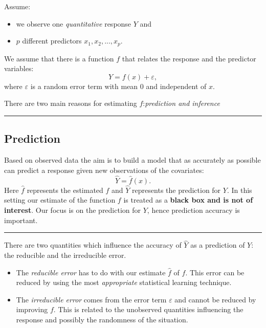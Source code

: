 \documentclass[]{article}
\providecommand{\tightlist}{%
  \setlength{\itemsep}{0pt}\setlength{\parskip}{0pt}}
\begin{document}
Assume:

\begin{itemize}
\tightlist
\item
  we observe one \emph{quantitative} response \(Y\) and
\item
  \(p\) different predictors \(x_1, x_2,... , x_p\).
\end{itemize}

We assume that there is a function \(f\) that relates the response and
the predictor variables: \[ Y = f(x) + \varepsilon,\] where
\(\varepsilon\) is a random error term with mean 0 and independent of
\(x\).

There are two main reasons for estimating \(f\):\emph{prediction and
inference}

\begin{center}\rule{0.5\linewidth}{\linethickness}\end{center}

\hypertarget{prediction}{%
\subsection{Prediction}\label{prediction}}

Based on observed data the aim is to build a model that as accurately as
possible can predict a response given new observations of the
covariates: \[\hat{Y} = \hat{f}(x).\] Here \(\hat{f}\) represents the
estimated \(f\) and \(\hat{Y}\) represents the prediction for \(Y\). In
this setting our estimate of the function \(f\) is treated as a
\textbf{black box and is not of interest}. Our focus is on the
prediction for \(Y\), hence prediction accuracy is important.

\begin{center}\rule{0.5\linewidth}{\linethickness}\end{center}

There are two quantities which influence the accuracy of \(\hat{Y}\) as
a prediction of \(Y\): the reducible and the irreducible error.

\begin{itemize}
\tightlist
\item
  The \emph{reducible error} has to do with our estimate \(\hat{f}\) of
  \(f\). This error can be reduced by using the most \emph{appropriate}
  statistical learning technique.
\item
  The \emph{irreducible error} comes from the error term \(\varepsilon\)
  and cannot be reduced by improving \(f\). This is related to the
  unobserved quantities influencing the response and possibly the
  randomness of the situation.
\end{itemize}
\end{document}
